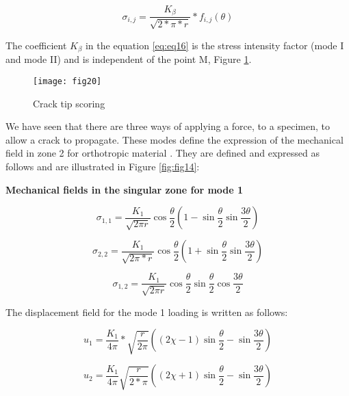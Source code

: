 \begin{equation}
	\sigma_{i,j} = \frac{K_{\beta}}{\sqrt{2*\pi*r}}*f_{i,j}(\theta)
	\label{eq:eq16}
\end{equation}

The coefficient $K_\beta$ in the equation \ref{eq:eq16} is the stress intensity factor (mode I and mode II) and is independent of the point M, Figure \ref{fig:fig20}.


\begin{figure}[htp]
	\centering
	\texttt{[image: fig20]}
	\caption{Crack tip scoring}
	\label{fig:fig20}
\end{figure}

We have seen that there are three ways of applying a force, to a specimen, to allow a crack to propagate. These modes define the expression of the mechanical field in zone 2 for orthotropic material \cite{Odounga2018phd}. They are defined and expressed as follows and are illustrated in Figure \ref{fig:fig14}:

\textbf{Mechanical fields in the singular zone for mode 1}

\begin{equation}
	\sigma_{1,1} = \frac{K_{1}}{\sqrt{2 \pi r}} \cos{\frac{\theta}{2}}  \left( 1-\sin{\frac{\theta}{2}} \sin{\frac{3 \theta}{2}} \right)
	\label{eq:eq17}
\end{equation}

\begin{equation}
	\sigma_{2,2} = \frac{K_{1}}{\sqrt{2 \pi*r}} \cos{\frac{\theta}{2}}  \left( 1+\sin{\frac{\theta}{2}} \sin{\frac{3 \theta}{2}} \right)
	\label{eq:eq18}
\end{equation}

\begin{equation}
	\sigma_{1,2} = \frac{K_{1}}{\sqrt{2 \pi r}} \cos{\frac{\theta}{2}}  \sin{\frac{\theta}{2}} \cos{\frac{3 \theta}{2}}
	\label{eq:eq19}
\end{equation}

The displacement field for the mode 1 loading is written as follows:

\begin{equation}
	u_{1} = \frac{K_{1}}{4 \pi}*\sqrt{\frac{r}{2 \pi}} \left((2 \chi-1) \sin{\frac{\theta}{2}}-\sin{\frac{3 \theta}{2}}\right)
	\label{eq:eq110}
\end{equation}

\begin{equation}
	u_{2} = \frac{K_{1}}{4 \pi} \sqrt{\frac{r}{2*\pi}} \left((2 \chi+1) \sin{\frac{\theta}{2}}-\sin{\frac{3 \theta}{2}}\right)
	\label{eq:eq111}
\end{equation}


